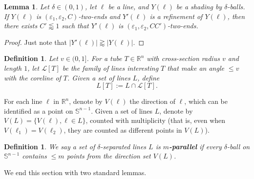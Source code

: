 \documentclass{amsart}
\numberwithin{equation}{section}
\newtheorem{lemma}[theorem]{Lemma}
\newtheorem{definition}[theorem]{Definition}
\newcommand{\de}{\delta}
\newcommand{\e}{\varepsilon}
\newcommand{\ZR}{\mathbb{R}}
\newcommand{\ZS}{\mathbb{S}}
\newcommand{\cl}{{\mathcal L}}
\begin{document}
\begin{lemma}
\label{two-ends-shading-lem}
Let $\de\in(0,1)$, let $\ell$ be a line, and $Y(\ell)$ be a shading by $\de$-balls.
If $Y(\ell)$ is $(\e_1,\e_2,C)$-two-ends and $Y'(\ell)$ is a refinement of $Y(\ell)$, then there exists $C'\lessapprox1$ such that $Y'(\ell)$ is $(\e_1,\e_2,CC')$-two-ends.
\end{lemma}
\begin{proof}
Just note that $|Y'(\ell)|\gtrapprox|Y(\ell)|$.
\end{proof}


\smallskip


\begin{definition}
\label{L[T]-def}
Let $v\in(0,1]$.
For a tube $T\in\ZR^n$ with cross-section radius $v$ and length $1$, let $\cl[T]$ be the family of lines interesting $T$ that make an angle $\leq v$ with the coreline of $T$.
Given a set of lines $L$, define
\begin{equation}
    L[T]:=L\cap \cl[T].
\end{equation}
\end{definition}


For each line $\ell$ in $\ZR^n$, denote by $V(\ell)$ the direction of $\ell$, which can be identified as a point on $\ZS^{n-1}$.
Given a set of lines $L$, denote by $V(L)=\{V(\ell), \ell\in L\}$, counted with multiplicity (that is, even when $V(\ell_1)=V(\ell_2)$, they are counted as different points in $V(L)$).

\begin{definition}
We say a set of $\de$-separated lines $L$ is {\bf $m$-parallel} if every $\de$-ball on $\ZS^{n-1}$ contains $\leq m$ points from the direction set $V(L)$.
\end{definition}



\smallskip

We end this section with two standard lemmas.
\end{document}

